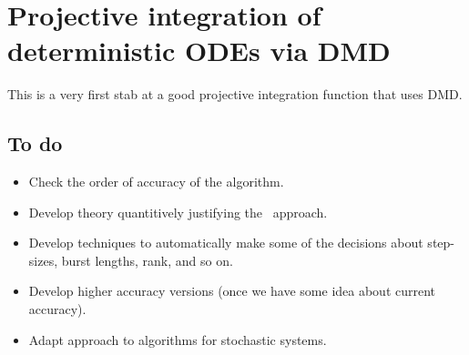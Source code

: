 \section{Projective integration of deterministic ODEs via DMD}
\label{sec:ProjIntDMD}
\localtableofcontents

This is a very first stab at a good projective integration function that uses DMD.







\subsection{To do}
\begin{itemize}
\item Check the order of accuracy of the algorithm.
\item Develop theory quantitively justifying the \dmd\ approach.
\item Develop techniques to automatically make some of the decisions about step-sizes, burst lengths, rank, and so on.
\item Develop higher accuracy versions (once we have some idea about current accuracy).
\item Adapt approach to algorithms for stochastic systems.
\end{itemize}

